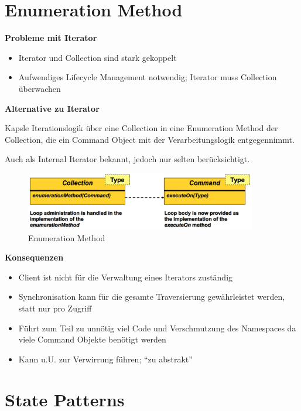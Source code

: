 \section{Enumeration Method}

\textbf{Probleme mit Iterator}

\begin{itemize}
	\item Iterator und Collection sind stark gekoppelt
	\item Aufwendiges Lifecycle Management notwendig; Iterator muss Collection überwachen
\end{itemize}

\textbf{Alternative zu Iterator}

Kapsle Iterationslogik über eine Collection in eine Enumeration Method der Collection, die ein Command Object mit der Verarbeitungslogik entgegennimmt.

Auch als Internal Iterator bekannt, jedoch nur selten berücksichtigt.

\begin{figure}[H]
	\centering
	\includegraphics[width=0.9\textwidth]{content/advancedPatterns/enumerationmethod.png}
	\caption{Enumeration Method}
\end{figure}

\textbf{Konsequenzen}

\begin{itemize}
	\item Client ist nicht für die Verwaltung eines Iterators zuständig
	\item Synchronisation kann für die gesamte Traversierung gewährleistet werden, statt nur pro Zugriff
	\item Führt zum Teil zu unnötig viel Code und Verschmutzung des Namespaces da viele Command Objekte benötigt werden
	\item Kann u.U. zur Verwirrung führen; ``zu abstrakt''
\end{itemize}


\section{State Patterns}

